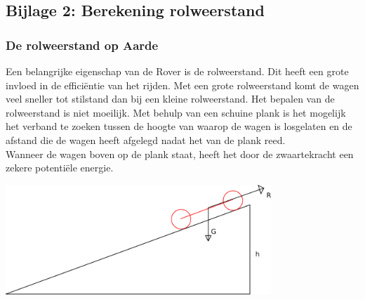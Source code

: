 \subsection{Bijlage 2: Berekening rolweerstand}

\subsubsection{De rolweerstand op Aarde}

Een belangrijke eigenschap van de Rover is de rolweerstand. Dit heeft een grote invloed in de effici\"entie van het rijden. Met een grote rolweerstand komt de wagen veel sneller tot stilstand dan bij een kleine rolweerstand. Het bepalen van de rolweerstand is niet moeilijk. Met behulp van een schuine plank is het mogelijk het verband te zoeken tussen de hoogte van waarop de wagen is losgelaten en de afstand die de wagen heeft afgelegd nadat het van de plank reed.\\
Wanneer de wagen boven op de plank staat, heeft het door de zwaartekracht een zekere potenti\"ele energie.

\includegraphics[width=10cm]{bijlagen/bijlage-2/rolweerstand.png}

